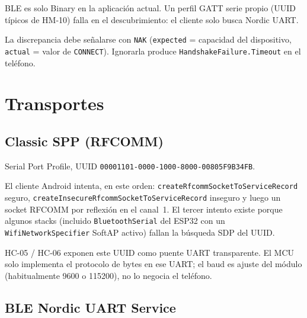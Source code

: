 \documentclass[12pt,a4paper]{article}
\begin{document}
BLE es solo Binary en la aplicación actual.
Un perfil GATT serie propio (UUID típicos de HM-10) falla en el descubrimiento:
el cliente solo busca Nordic UART.

La discrepancia debe señalarse con \texttt{NAK} (\texttt{expected} = capacidad
del dispositivo, \texttt{actual} = valor de \texttt{CONNECT}).
Ignorarla produce \texttt{HandshakeFailure.Timeout} en el teléfono.

\section{Transportes}
\label{sec:pipes}

\subsection{Classic SPP (RFCOMM)}

Serial Port Profile, UUID
\texttt{00001101-0000-1000-8000-00805F9B34FB}.

El cliente Android intenta, en este orden:
\texttt{createRfcommSocketToServiceRecord} seguro,
\texttt{createInsecureRfcommSocketToServiceRecord} inseguro y luego un
socket RFCOMM por reflexión en el canal~1.
El tercer intento existe porque algunos stacks (incluido
\texttt{BluetoothSerial} del ESP32 con un \texttt{WifiNetworkSpecifier}
SoftAP activo) fallan la búsqueda SDP del UUID.

HC-05 / HC-06 exponen este UUID como puente UART transparente.
El MCU solo implementa el protocolo de bytes en ese UART; el baud es
ajuste del módulo (habitualmente 9600 o 115200), no lo negocia el teléfono.

\subsection{BLE Nordic UART Service}
\end{document}
